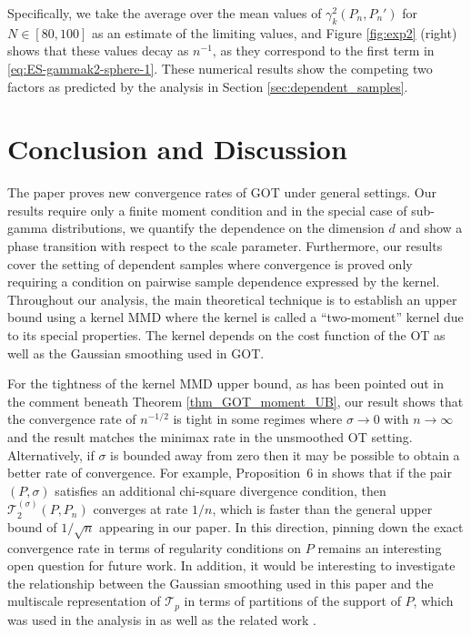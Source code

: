 \documentclass{article}
\theoremstyle{definition}
\newcommand{\cT}{\mathcal{T}}
\begin{document}
Specifically, we take the average over the mean values of $\gamma_k^2( P_n, P_n')$  for $N \in [80, 100]$ as an estimate of the limiting values, and Figure \ref{fig:exp2} (right) shows that these values decay as $n^{-1}$, as they correspond to  the first term in \eqref{eq:ES-gammak2-sphere-1}.
These numerical results show the competing two factors as predicted by the analysis in Section \ref{sec:dependent_samples}.


\section{Conclusion and Discussion}

The paper proves new convergence rates of GOT under general settings. Our results require only a finite moment condition and in the special case of sub-gamma distributions, we quantify the dependence on the dimension $d$ and show a phase transition with respect to the scale parameter. Furthermore, our results cover the setting of dependent samples where convergence is proved only requiring a condition on pairwise sample dependence expressed by the kernel. 
Throughout our analysis, the main theoretical technique is to establish an upper bound using a kernel MMD where the kernel is called a ``two-moment'' kernel due to its special properties. 
The kernel depends on the cost function of the OT as well as the Gaussian smoothing used in GOT.


For the tightness of the kernel MMD upper bound,
as has been pointed out in the comment beneath Theorem \ref{thm_GOT_moment_UB}, our result shows that the convergence rate of  $n^{-1/2}$ is tight 
in some regimes where $\sigma \to 0$ with $n \to \infty$ and the result matches the minimax rate in the unsmoothed OT setting. Alternatively, if $\sigma$ is bounded away from zero then it may be possible to obtain a better rate of convergence.
For example,  Proposition~6 in \cite{goldfeld:2020b} 
shows that if  the pair $(P,\sigma)$ satisfies an  additional chi-square divergence condition, then  $\mathcal{T}_2^{(\sigma)}(P, P_n)$ converges at rate $1/n$, which is faster than the general upper bound of $1/\sqrt{n}$ appearing in our paper. 
In this direction, pinning down the exact convergence rate in terms of regularity conditions on $P$ remains an interesting open question for future work. 
In addition, it would be interesting to investigate the relationship between the Gaussian smoothing used in this paper and the multiscale representation  of  $\cT_p$ in terms of partitions of the support of $P$,
which was used in the analysis in \cite{fournier:2015} as well as the related work \cite{weed2019sharp}.
\end{document}
